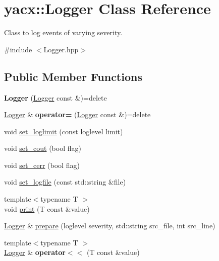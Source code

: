 \hypertarget{classyacx_1_1_logger}{}\section{yacx\+:\+:Logger Class Reference}
\label{classyacx_1_1_logger}


Class to log events of varying severity.  




{\ttfamily \#include $<$Logger.\+hpp$>$}

\subsection*{Public Member Functions}
\begin{DoxyCompactItemize}
\item 
\mbox{\label{classyacx_1_1_logger_a5f9e5ace3cf80d8b6f70589e1c6b2170}} 
{\bfseries Logger} (\hyperlink{classyacx_1_1_logger}{Logger} const \&)=delete
\item 
\mbox{\label{classyacx_1_1_logger_a69515e5c573ddeaa46a5eab4f15dc09c}} 
\hyperlink{classyacx_1_1_logger}{Logger} \& {\bfseries operator=} (\hyperlink{classyacx_1_1_logger}{Logger} const \&)=delete
\item 
void \hyperlink{classyacx_1_1_logger_af33e8d52379eb2147a0b2ff51f7839c4}{set\+\_\+loglimit} (const loglevel limit)
\item 
void \hyperlink{classyacx_1_1_logger_a3da3e41f4cb2ddec4c63b8225548ac89}{set\+\_\+cout} (bool flag)
\item 
void \hyperlink{classyacx_1_1_logger_adafa134c34c18199c05e49d6ef5dd260}{set\+\_\+cerr} (bool flag)
\item 
void \hyperlink{classyacx_1_1_logger_a88b7b8dd9e533198ca879d3e7c0af5f0}{set\+\_\+logfile} (const std\+::string \&file)
\item 
{\footnotesize template$<$typename T $>$ }\\void \hyperlink{classyacx_1_1_logger_ae415e11962c5d6b3604a6aa4cf198dca}{print} (T const \&value)
\item 
\hyperlink{classyacx_1_1_logger}{Logger} \& \hyperlink{classyacx_1_1_logger_ac659e0b4e6d1777bc2538c03d17b5791}{prepare} (loglevel severity, std\+::string src\+\_\+file, int src\+\_\+line)
\item 
\mbox{\label{classyacx_1_1_logger_afc231a3ebcb40673eac5b456464b562d}} 
{\footnotesize template$<$typename T $>$ }\\\hyperlink{classyacx_1_1_logger}{Logger} \& {\bfseries operator$<$$<$} (T const \&value)
\end{DoxyCompactItemize}
